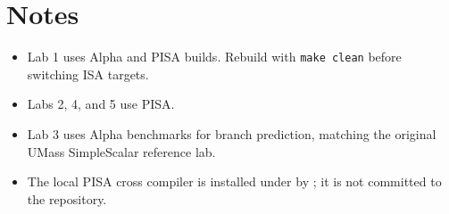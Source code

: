 \documentclass[11pt]{article}
\begin{document}
\section{Notes}
\begin{itemize}
\item Lab 1 uses Alpha and PISA builds. Rebuild with \texttt{make clean} before switching ISA targets.
\item Labs 2, 4, and 5 use PISA.
\item Lab 3 uses Alpha benchmarks for branch prediction, matching the original UMass SimpleScalar reference lab.
\item The local PISA cross compiler is installed under  by ; it is not committed to the repository.
\end{itemize}
\end{document}
